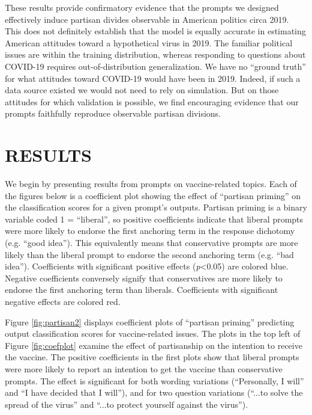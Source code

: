 \documentclass{article} %
\begin{document}
These results provide confirmatory evidence that the prompts we designed
effectively induce partisan divides observable in American politics
circa 2019. This does not definitely establish that the model is equally
accurate in estimating American attitudes toward a hypothetical virus in
2019. The familiar political issues are within the training
distribution, whereas responding to questions about COVID-19 requires
out-of-distribution generalization. We have no ``ground truth'' for what
attitudes toward COVID-19 would have been in 2019. Indeed, if such a
data source existed we would not need to rely on simulation. But on
those attitudes for which validation is possible, we find encouraging
evidence that our prompts faithfully reproduce observable partisan
divisions.

\section*{RESULTS}

We begin by presenting results from prompts on vaccine-related topics.
Each of the figures below is a coefficient plot showing the effect of
``partisan priming'' on the classification scores for a given prompt's
outputs. Partisan priming is a binary variable coded 1 = ``liberal'', so
positive coefficients indicate that liberal prompts were more likely to
endorse the first anchoring term in the response dichotomy (e.g. ``good
idea''). This equivalently means that conservative prompts are more
likely than the liberal prompt to endorse the second anchoring term
(e.g. ``bad idea''). Coefficients with significant positive effects
(\emph{p}\textless0.05) are colored blue. Negative coefficients
conversely signify that conservatives are more likely to endorse the
first anchoring term than liberals. Coefficients with significant
negative effects are colored red.

Figure \ref{fig:partisan2} displays coefficient plots of ``partisan priming'' predicting
output classification scores for vaccine-related issues. The plots in
the top left of Figure \ref{fig:coefplot} examine the effect of partisanship on the
intention to receive the vaccine. The positive coefficients in the first
plots show that liberal prompts were more likely to report an intention
to get the vaccine than conservative prompts. The effect is significant
for both wording variations (``Personally, I will'' and ``I have decided
that I will''), and for two question variations (``...to solve the
spread of the virus'' and ``...to protect yourself against the virus'').
\end{document}
